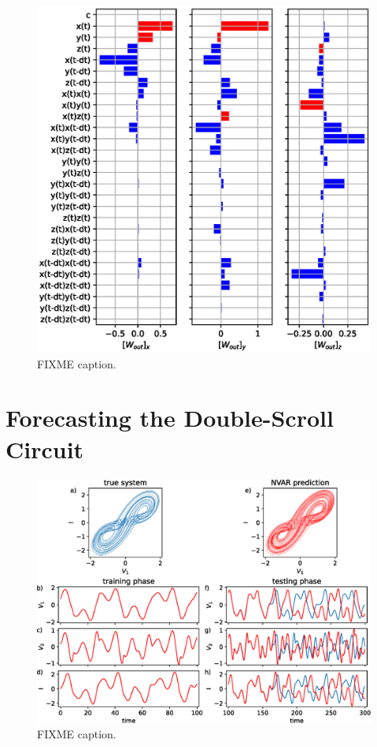 \begin{figure}
  \includegraphics{figures/nvar-predict-lorenz-wout}
  \caption{FIXME caption.}
  \label{fig:nvar-predict-lorenz-wout}
\end{figure}

\section{Forecasting the Double-Scroll Circuit}

\begin{figure}
  \includegraphics[width=\textwidth]{figures/nvar-predict-dscroll}
  \caption{FIXME caption.}
  \label{fig:nvar-predict-dscroll}
\end{figure}

